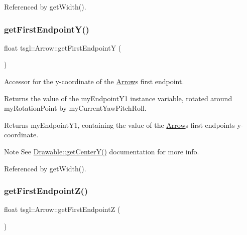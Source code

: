 Referenced by get\+Width().

\mbox{\label{classtsgl_1_1_arrow_ad83e321d535001bb4172b3009ff82f19}} 
\subsubsection{\texorpdfstring{get\+First\+Endpoint\+Y()}{getFirstEndpointY()}}
{\footnotesize\ttfamily float tsgl\+::\+Arrow\+::get\+First\+EndpointY (\begin{DoxyParamCaption}{ }\end{DoxyParamCaption})}



Accessor for the y-\/coordinate of the \hyperlink{classtsgl_1_1_arrow}{Arrow}\textquotesingle{}s first endpoint. 

Returns the value of the my\+Endpoint\+Y1 instance variable, rotated around my\+Rotation\+Point by my\+Current\+Yaw\+Pitch\+Roll. \begin{DoxyReturn}{Returns}
my\+Endpoint\+Y1, containing the value of the \hyperlink{classtsgl_1_1_arrow}{Arrow}\textquotesingle{}s first endpoint\textquotesingle{}s y-\/coordinate. 
\end{DoxyReturn}
\begin{DoxyNote}{Note}
See \hyperlink{classtsgl_1_1_drawable_ad78d781f078bab0f458892757f100e7f}{Drawable\+::get\+Center\+Y()} documentation for more info. 
\end{DoxyNote}


Referenced by get\+Width().

\mbox{\label{classtsgl_1_1_arrow_aed21293d711501354026d26615146d03}} 
\subsubsection{\texorpdfstring{get\+First\+Endpoint\+Z()}{getFirstEndpointZ()}}
{\footnotesize\ttfamily float tsgl\+::\+Arrow\+::get\+First\+EndpointZ (\begin{DoxyParamCaption}{ }\end{DoxyParamCaption})}



